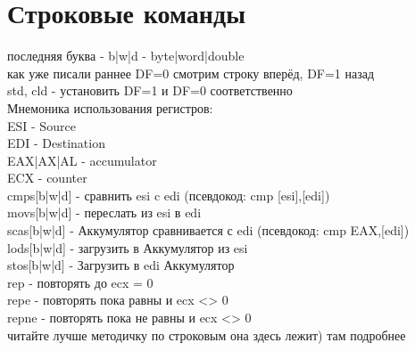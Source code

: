 \documentclass[a4paper,10pt]{article}
\begin{document}
\section*{Строковые команды}
последняя буква - b|w|d - byte|word|double \\
как уже писали раннее DF=0 смотрим строку вперёд, DF=1 назад \\
std, cld - установить DF=1 и DF=0 соответственно \\
Мнемоника использования регистров: \\
ESI - Source \\
EDI - Destination \\
EAX|AX|AL - accumulator \\
ECX - counter \\
\vspace{0.5cm}
cmps[b|w|d] - сравнить esi c edi (псевдокод: cmp [esi],[edi])\\
movs[b|w|d] - переслать из esi в edi\\
scas[b|w|d] - Аккумулятор сравнивается с edi (псевдокод: cmp EAX,[edi]) \\
lods[b|w|d] - загрузить в Аккумулятор из esi \\
stos[b|w|d] - Загрузить в edi Аккумулятор \\
rep - повторять до ecx = 0 \\
repe - повторять пока равны и ecx <> 0 \\
repne - повторять пока не равны и ecx <> 0 \\
читайте лучше методичку по строковым она здесь лежит) там подробнее
\end{document}
